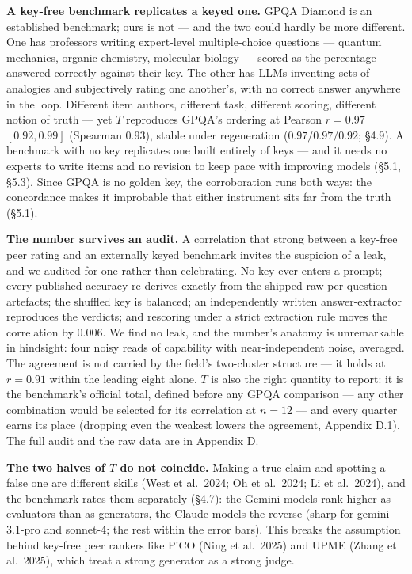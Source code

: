\textbf{A key-free benchmark replicates a keyed one.} GPQA Diamond is an established benchmark; ours is not --- and the two could hardly be more different. One has professors writing expert-level multiple-choice questions --- quantum mechanics, organic chemistry, molecular biology --- scored as the percentage answered correctly against their key. The other has LLMs inventing sets of analogies and subjectively rating one another's, with no correct answer anywhere in the loop. Different item authors, different task, different scoring, different notion of truth --- yet \(T\) reproduces GPQA's ordering at Pearson \(r = 0.97\) \([0.92, 0.99]\) (Spearman \(0.93\)), stable under regeneration (\(0.97/0.97/0.92\); §4.9). A benchmark with no key replicates one built entirely of keys --- and it needs no experts to write items and no revision to keep pace with improving models (§5.1, §5.3). Since GPQA is no golden key, the corroboration runs both ways: the concordance makes it improbable that either instrument sits far from the truth (§5.1).

\textbf{The number survives an audit.} A correlation that strong between a key-free peer rating and an externally keyed benchmark invites the suspicion of a leak, and we audited for one rather than celebrating. No key ever enters a prompt; every published accuracy re-derives exactly from the shipped raw per-question artefacts; the shuffled key is balanced; an independently written answer-extractor reproduces the verdicts; and rescoring under a strict extraction rule moves the correlation by \(0.006\). We find no leak, and the number's anatomy is unremarkable in hindsight: four noisy reads of capability with near-independent noise, averaged. The agreement is not carried by the field's two-cluster structure --- it holds at \(r = 0.91\) within the leading eight alone. \(T\) is also the right quantity to report: it is the benchmark's official total, defined before any GPQA comparison --- any other combination would be selected for its correlation at \(n=12\) --- and every quarter earns its place (dropping even the weakest lowers the agreement, Appendix D.1). The full audit and the raw data are in Appendix D.

\textbf{The two halves of \(T\) do not coincide.} Making a true claim and spotting a false one are different skills (West et al.~2024; Oh et al.~2024; Li et al.~2024), and the benchmark rates them separately (§4.7): the Gemini models rank higher as evaluators than as generators, the Claude models the reverse (sharp for gemini-3.1-pro and sonnet-4; the rest within the error bars). This breaks the assumption behind key-free peer rankers like PiCO (Ning et al.~2025) and UPME (Zhang et al.~2025), which treat a strong generator as a strong judge.

